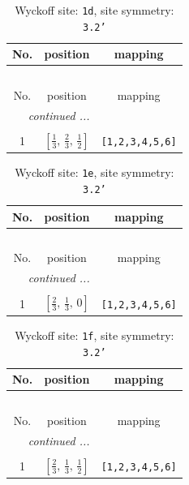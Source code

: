 \documentclass[fleqn,8pt]{jsarticle}
\begin{document}
\renewcommand{\arraystretch}{1.2}
\begin{longtable}{ccc}
\caption{Wyckoff site: {\tt 1d}, site symmetry: {\tt 3.2'}}
 \\
 \hline \hline
No. & position & mapping \\ \hline \endfirsthead

\multicolumn{2}{l}{\tablename\ \thetable{}} \\
 \hline \hline
No. & position & mapping \\ \hline \endhead

 \hline \hline
\multicolumn{2}{r}{\footnotesize\it continued ...} \\ \endfoot

 \hline \hline
\multicolumn{2}{r}{} \\ \endlastfoot

1 & $\left[ \frac{1}{3},\, \frac{2}{3},\, \frac{1}{2} \right]$ & {\tt [1,2,3,4,5,6]} \\
\end{longtable}
\renewcommand{\arraystretch}{1.2}
\begin{longtable}{ccc}
\caption{Wyckoff site: {\tt 1e}, site symmetry: {\tt 3.2'}}
 \\
 \hline \hline
No. & position & mapping \\ \hline \endfirsthead

\multicolumn{2}{l}{\tablename\ \thetable{}} \\
 \hline \hline
No. & position & mapping \\ \hline \endhead

 \hline \hline
\multicolumn{2}{r}{\footnotesize\it continued ...} \\ \endfoot

 \hline \hline
\multicolumn{2}{r}{} \\ \endlastfoot

1 & $\left[ \frac{2}{3},\, \frac{1}{3},\, 0 \right]$ & {\tt [1,2,3,4,5,6]} \\
\end{longtable}
\renewcommand{\arraystretch}{1.2}
\begin{longtable}{ccc}
\caption{Wyckoff site: {\tt 1f}, site symmetry: {\tt 3.2'}}
 \\
 \hline \hline
No. & position & mapping \\ \hline \endfirsthead

\multicolumn{2}{l}{\tablename\ \thetable{}} \\
 \hline \hline
No. & position & mapping \\ \hline \endhead

 \hline \hline
\multicolumn{2}{r}{\footnotesize\it continued ...} \\ \endfoot

 \hline \hline
\multicolumn{2}{r}{} \\ \endlastfoot

1 & $\left[ \frac{2}{3},\, \frac{1}{3},\, \frac{1}{2} \right]$ & {\tt [1,2,3,4,5,6]} \\
\end{longtable}
\end{document}

